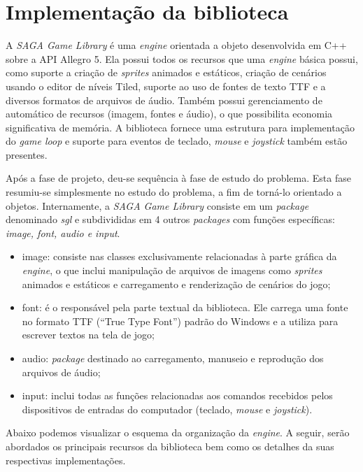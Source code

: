 \section{Implementação da biblioteca}
%
%
A \textit{SAGA Game Library} é uma \textit{engine} orientada a objeto desenvolvida em C++ sobre a API Allegro 5. Ela possui todos os recursos que uma \textit{engine} básica possui, como suporte a criação de \textit{sprites} animados e estáticos, criação de cenários usando o editor de níveis Tiled, suporte ao uso de fontes de texto TTF e a diversos formatos de arquivos de áudio. Também possui gerenciamento de automático de recursos (imagem, fontes e áudio), o que possibilita economia significativa de memória. A biblioteca fornece uma estrutura para implementação do \textit{game loop} e suporte para eventos de teclado, \textit{mouse} e \textit{joystick} também estão presentes. 
\par 
Após a fase de projeto, deu-se sequência à fase de estudo do problema. Esta fase resumiu-se simplesmente no estudo do problema, a fim de torná-lo orientado a objetos. Internamente, a \textit{SAGA Game Library} consiste em um \textit{package} denominado \textit{sgl} e subdivididas em 4 outros \textit{packages} com funções específicas: \textit{image, font, audio e input}.
%
%
\begin{itemize}
 \item image: consiste nas classes exclusivamente relacionadas à parte gráfica da \textit{engine}, o que inclui manipulação de arquivos de imagens como \textit{sprites} animados e estáticos e carregamento e renderização de cenários do jogo;
 \item font: é o responsável pela parte textual da biblioteca. Ele carrega uma fonte no formato TTF (``True Type Font'') padrão do Windows e a utiliza para escrever textos na tela de jogo;
 \item audio: \textit{package} destinado ao carregamento, manuseio e reprodução dos arquivos de áudio;
 \item input: inclui todas as funções relacionadas aos comandos recebidos pelos dispositivos de entradas do computador (teclado, \textit{mouse} e \textit{joystick}).
\end{itemize}
%
Abaixo podemos visualizar o esquema da organização da \textit{engine}. A seguir, serão abordados os principais recursos da biblioteca bem como os detalhes da suas respectivas implementações.
%
%
%
%
